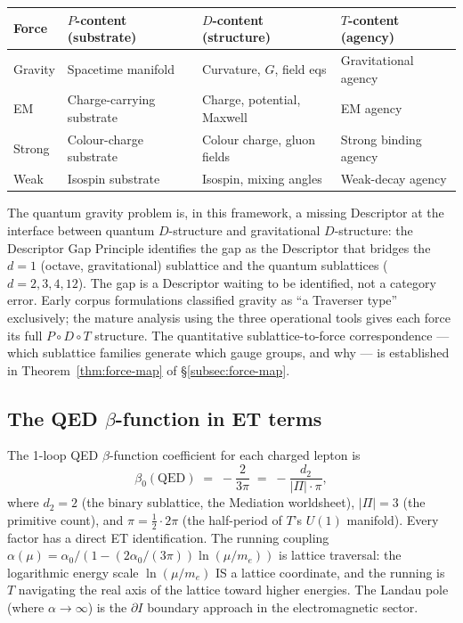 \documentclass[11pt,a4paper]{article}
\theoremstyle{definition}
\theoremstyle{remark}
\begin{document}
\begin{center}
\small
\begin{tabular}{llll}
\toprule
\textbf{Force} & \textbf{$P$-content (substrate)} & \textbf{$D$-content (structure)} & \textbf{$T$-content (agency)} \\
\midrule
Gravity & Spacetime manifold & Curvature, $G$, field eqs & Gravitational agency \\
EM & Charge-carrying substrate & Charge, potential, Maxwell & EM agency \\
Strong & Colour-charge substrate & Colour charge, gluon fields & Strong binding agency \\
Weak & Isospin substrate & Isospin, mixing angles & Weak-decay agency \\
\bottomrule
\end{tabular}
\end{center}

The quantum gravity problem is, in this framework, a missing Descriptor at the interface between quantum $D$-structure and gravitational $D$-structure: the Descriptor Gap Principle identifies the gap as the Descriptor that bridges the $d = 1$ (octave, gravitational) sublattice and the quantum sublattices ($d = 2, 3, 4, 12$). The gap is a Descriptor waiting to be identified, not a category error. Early corpus formulations classified gravity as ``a Traverser type'' exclusively; the mature analysis using the three operational tools gives each force its full $P \circ D \circ T$ structure. The quantitative sublattice-to-force correspondence --- which sublattice families generate which gauge groups, and why --- is established in Theorem~\ref{thm:force-map} of \S\ref{subsec:force-map}.

\subsection{The QED $\beta$-function in ET terms}\label{subsec:QED-beta}

The 1-loop QED $\beta$-function coefficient for each charged lepton is
\[
\beta_{0}(\mathrm{QED}) \;=\; -\frac{2}{3\pi} \;=\; -\frac{d_{2}}{|\Pi| \cdot \pi},
\]
where $d_{2} = 2$ (the binary sublattice, the Mediation worldsheet), $|\Pi| = 3$ (the primitive count), and $\pi = \tfrac{1}{2} \cdot 2\pi$ (the half-period of $T$'s $U(1)$ manifold). Every factor has a direct ET identification. The running coupling $\alpha(\mu) = \alpha_{0}/(1 - (2\alpha_{0}/(3\pi))\ln(\mu/m_{e}))$ is lattice traversal: the logarithmic energy scale $\ln(\mu/m_{e})$ IS a lattice coordinate, and the running is $T$ navigating the real axis of the lattice toward higher energies. The Landau pole (where $\alpha \to \infty$) is the $\partial I$ boundary approach in the electromagnetic sector.
\end{document}
